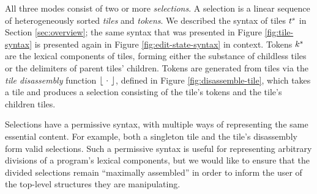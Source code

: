 All three modes consist of two or more \emph{selections}.
A selection is a linear sequence of heterogeneously
sorted \emph{tiles} and \emph{tokens}.
We described the syntax of tiles $t^s$
in Section \ref{sec:overview};
the same syntax that was presented in Figure \ref{fig:tile-syntax}
is presented again in Figure \ref{fig:edit-state-syntax} in context.
Tokens $k^s$ are the lexical components of tiles, forming either
the substance of childless tiles or the delimiters of parent
tiles' children.
Tokens are generated from tiles via the \emph{tile disassembly} function
$\left\lfloor~\cdot~\right\rfloor$, defined in Figure \ref{fig:disassemble-tile},
which takes a tile and produces
a selection consisting of the tile's tokens
and the tile's children tiles.

Selections have a permissive syntax, with multiple
ways of representing the same essential content.
For example, both a singleton tile and the tile's disassembly
form valid selections.
Such a permissive syntax is useful for representing
arbitrary divisions of a program's
lexical components, but we would like to ensure
that the divided selections remain ``maximally assembled''
in order to inform the user of the top-level structures
they are manipulating.

